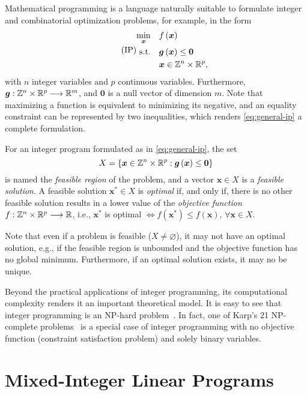 Mathematical programming is a language naturally suitable to formulate integer and combinatorial optimization problems, for example, in the form
\begin{equation}\label{eq:general-ip}\tag{IP}
    \begin{split}
	\min_{\bm{x}} \quad & f\left( \bm{x} \right) \\
	\textrm{s.t.} \quad & \bm{g}\left( \bm{x} \right) \le \bm{0} \\
	  & \bm{x} \in \mathbb{Z}^{n}\times \mathbb{R}^{p}
    ,\end{split}
\end{equation}
with $n$ integer variables and $p$ continuous variables.
Furthermore, $\bm{g}: \mathbb{Z}^{n}\times \mathbb{R}^{p} \longrightarrow \mathbb{R}^{m}$,  and $\bm{0}$ is a null vector of dimension $m$.
Note that maximizing a function is equivalent to minimizing its negative, and an equality constraint can be represented by two inequalities, which renders \eqref{eq:general-ip} a complete formulation.

For an integer program formulated as in \eqref{eq:general-ip}, the set \[
X=\left\{ \bm{x}\in \mathbb{Z}^{n}\times \mathbb{R}^{p}: \bm{g}\left( \bm{x} \right) \le \bm{0}\right\} 
\] is named the \emph{feasible region} of the problem, and a vector $\bm{x}\in X$ is a \emph{feasible solution}.
A feasible solution $\bm{x}^{*}\in X$ is \emph{optimal} if, and only if, there is no other feasible solution results in a lower value of the \emph{objective function} $f: \mathbb{Z}^{n}\times \mathbb{R}^{p} \longrightarrow \mathbb{R}$, i.e., $\bm{x}^{*}$ is optimal $\iff f(\bm{x}^{*}) \le f(\bm{x}) ,\,\forall \bm{x}\in X$.

Note that even if a problem is feasible ($X\neq \varnothing$), it may not have an optimal solution, e.g., if the feasible region is unbounded and the objective function has no global minimum.
Furthermore, if an optimal solution exists, it may no be unique.

Beyond the practical applications of integer programming, its computational complexity renders it an important theoretical model.
It is easy to see that integer programming is an NP-hard problem~\cite{nemhauserIntegerCombinatorialOptimization1999}.
In fact, one of Karp's 21 NP-complete problems~\cite{karpReducibilityCombinatorialProblems1972} is a special case of integer programming with no objective function (constraint satisfaction problem) and solely binary variables.

\section{Mixed-Integer Linear Programs}

